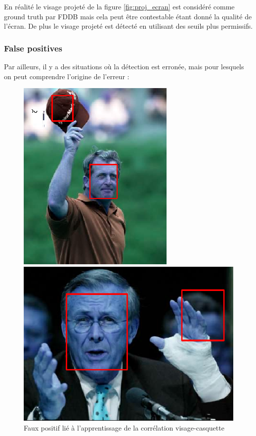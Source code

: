 \documentclass[a4paper,11pt]{article}
\begin{document}
En réalité le visage projeté de la figure \ref{fig:proj_ecran} est considéré comme ground truth par FDDB mais cela peut être contestable étant donné la qualité de l'écran. De plus le visage projeté est détecté en utilisant des seuils plus permissifs.\\

\subsubsection{False positives}

Par ailleurs, il y a des situations où la détection est erronée, mais pour lesquels on peut comprendre l'origine de l'erreur :\\

\begin{figure}[H]
    \centering
    \begin{minipage}[c]{0.45\linewidth}
        \begin{center}
            \includegraphics[scale=0.60]{facenetFP1.png}
            \caption{Faux positif lié à l'apprentissage de la corrélation visage-casquette}
        \end{center}
    \end{minipage} \hfill
    \begin{minipage}[c]{0.45\linewidth}
        \begin{center}
            \includegraphics[scale=0.45]{facenetFP2.png}

\end{center}
\end{minipage}
\end{figure}
\end{document}
